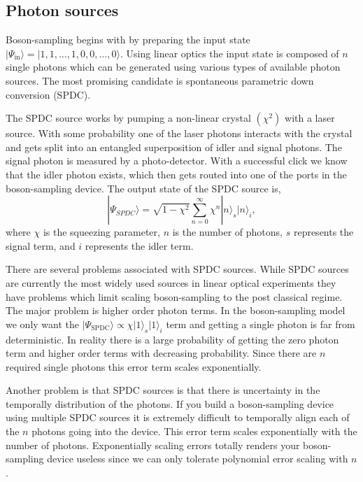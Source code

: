 \documentclass[aps,pra,twocolumn,amsmath,amssymb,nofootinbib,superscriptaddress]{revtex4}
\newcommand{\ket}[1]{|#1\rangle}
\begin{document}
\subsection{Photon sources}

Boson-sampling begins with by preparing the input state $\ket{\Psi_{\mathrm{in}}}=\ket{1,1,\dots,1,0,0,\dots,0}$. Using linear optics the input state is composed of $n$ single photons which can be generated using various types of available photon sources. The most promising candidate is spontaneous parametric down conversion (SPDC). 

The SPDC source works by pumping a non-linear crystal $(\chi^2)$ with a laser source. With some probability one of the laser photons interacts with the crystal and gets split into an entangled superposition of idler and signal photons. The signal photon is measured by a photo-detector. With a successful click we know that the idler photon exists, which then gets routed into one of the ports in the boson-sampling device. The output state of the SPDC source is,
\begin{equation} \label{SPDC}
\ket{\Psi_{SPDC}} = \sqrt{1-\chi^2}\sum_{n=0}^{\infty}\chi^n\ket{n}_s\ket{n}_i,
\end{equation}
where $\chi$ is the squeezing parameter, $n$ is the number of photons, $s$ represents the signal term, and $i$ represents the idler term.

There are several problems associated with SPDC sources. While SPDC sources are currently the most widely used sources in linear optical experiments they have problems which limit scaling boson-sampling to the post classical regime. The major problem is higher order photon terms. In the boson-sampling model we only want the $\ket{\Psi_{\mathrm{SPDC}}}\propto\chi\ket{1}_s\ket{1}_i$ term and getting a single photon is far from deterministic. In reality there is a large probability of getting the zero photon term and higher order terms with decreasing probability. Since there are $n$ required single photons this error term scales exponentially. 

Another problem is that SPDC sources is that there is uncertainty in the temporally distribution of the photons. If you build a boson-sampling device using multiple SPDC sources it is extremely difficult to temporally align each of the $n$ photons going into the device. This error term scales exponentially with the number of photons. Exponentially scaling errors totally renders your boson-sampling device useless since we can only tolerate polynomial error scaling with $n$. 
\end{document}
